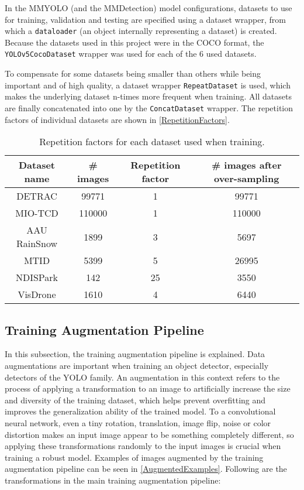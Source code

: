 In the MMYOLO (and the MMDetection) model configurations, datasets to use for
training, validation and testing are specified using a dataset wrapper, from
which a \texttt{dataloader} (an object internally representing a dataset) is
created. Because the datasets used in this project were in the COCO format, the
\texttt{YOLOv5CocoDataset} wrapper was used for each of the 6 used datasets.

To compensate for some datasets being smaller than others while being important
and of high quality, a dataset wrapper \texttt{RepeatDataset} is used, which
makes the underlying dataset n-times more frequent when training. All datasets are finally
concatenated into one by the \texttt{ConcatDataset} wrapper. The repetition
factors of individual datasets are shown in \autoref{RepetitionFactors}.

\begin{table}[h]
\centering
\small
\begin{tabular}{|c|c|c|c|}
    \hline
    Dataset name & \# images & Repetition factor & \# images after over-sampling \\
    \hline
    DETRAC       &  \num{99771} &  1 & \num{99771} \\
    MIO-TCD      & \num{110000} &  1 & \num{110000} \\
    AAU RainSnow &   \num{1899} &  3 & \num{5697} \\
    MTID         &   \num{5399} &  5 & \num{26995} \\
    NDISPark     &    \num{142} & 25 & \num{3550} \\
    VisDrone     &   \num{1610} &  4 & \num{6440} \\
    \hline
\end{tabular}
\caption{Repetition factors for each dataset used when training.}
\label{RepetitionFactors}
\end{table}



\subsection{Training Augmentation Pipeline}

In this subsection, the training augmentation pipeline is explained. Data
augmentations are important when training an object detector, especially
detectors of the YOLO family. An augmentation in this context refers to the
process of applying a transformation to an image to artificially increase the
size and diversity of the training dataset, which helps prevent overfitting and
improves the generalization ability of the trained model. To a convolutional
neural network, even a tiny rotation, translation, image flip, noise or color
distortion makes an input image appear to be something completely different, so
applying these transformations randomly to the input images is crucial when
training a robust model. Examples of images augmented by the training
augmentation pipeline can be seen in \autoref{AugmentedExamples}. Following are
the transformations in the main training augmentation pipeline:

